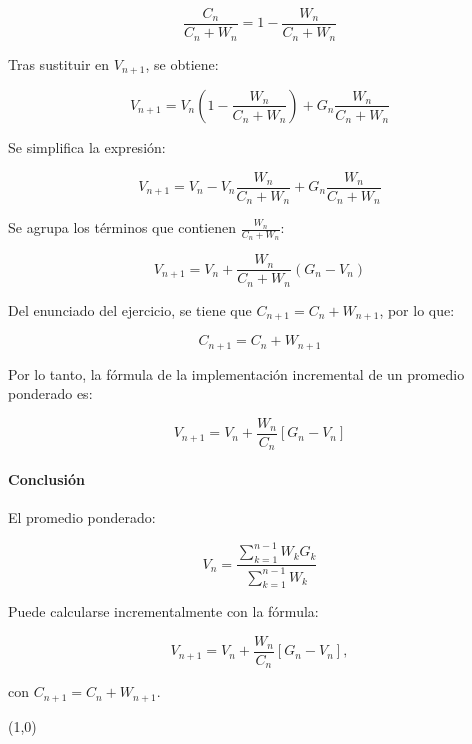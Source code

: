 \[
    \frac{C_n}{C_n + W_n} = 1 - \frac{W_n}{C_n + W_n}
\]

Tras sustituir en $V_{n+1}$, se obtiene:

\[
    V_{n+1} = V_n \left( 1 - \frac{W_n}{C_n + W_n} \right) + G_n \frac{W_n}{C_n + W_n}
\]

Se simplifica la expresión:

\[
    V_{n+1} = V_n - V_n \frac{W_n}{C_n + W_n} + G_n \frac{W_n}{C_n + W_n}
\]

Se agrupa los términos que contienen $\frac{W_n}{C_n + W_n}$:

\[
    V_{n+1} = V_n + \frac{W_n}{C_n + W_n} \left( G_n - V_n \right)
\]

Del enunciado del ejercicio, se tiene que $C_{n+1} = C_n + W_{n+1}$, por lo que:

\[
    C_{n+1} = C_n + W_{n+1}
\]

Por lo tanto, la fórmula de la implementación incremental de un promedio ponderado es:

\[
    V_{n+1} = V_n + \frac{W_n}{C_n}\left[G_n - V_n\right]
\]

\paragraph{Conclusión}

El promedio ponderado:

\[
    V_n = \frac{\sum_{k=1}^{n-1} W_k G_k}{\sum_{k=1}^{n-1} W_k}
\]

Puede calcularse incrementalmente con la fórmula:

\[
    V_{n+1} = V_n + \frac{W_n}{C_n}\left[G_n - V_n\right],
\]

con $C_{n+1} = C_n + W_{n+1}$.

\line(1,0){\textwidth}
